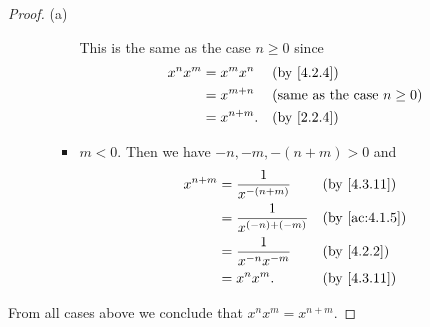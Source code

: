 \begin{proof}{(a)}
\begin{itemize}
\begin{itemize}
\begin{itemize}
                          This is the same as the case \(n \geq 0\) since
                          \begin{align*}
                            x^n x^m & = x^m x^n    &  & \by{4.2.4}                             \\
                                    & = x^{m + n}  &  & \text{(same as the case \(n \geq 0\))} \\
                                    & = x^{n + m}. &  & \by{2.2.4}
                          \end{align*}
                    \item \(m < 0\).
                          Then we have \(-n, -m, -(n + m) > 0\) and
                          \begin{align*}
                            x^{n + m} & = \dfrac{1}{x^{-(n + m)}}    &  & \by{4.3.11}   \\
                                      & = \dfrac{1}{x^{(-n) + (-m)}} &  & \by{ac:4.1.5} \\
                                      & = \dfrac{1}{x^{-n} x^{-m}}   &  & \by{4.2.2}    \\
                                      & = x^n x^m.                   &  & \by{4.3.11}
                          \end{align*}
                  \end{itemize}
          \end{itemize}
  \end{itemize}
  From all cases above we conclude that \(x^n x^m = x^{n + m}\).


\end{proof}
